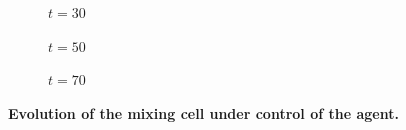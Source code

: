 \begin{figure}
\begin{subfigure}[t]{.22\textwidth}
    	\caption{$t=30$}
	\label{fig:mixing_field_30}
\end{subfigure} \quad
\begin{subfigure}[t]{.22\textwidth}
	\centering
    	\caption{$t=50$}
	\label{fig:mixing_field_50}
\end{subfigure} \quad
\begin{subfigure}[t]{.22\textwidth}
	\centering
    	\caption{$t=70$}
	\label{fig:mixing_field_70}
\end{subfigure}

\caption{\textbf{Evolution of the mixing cell under control of the agent.}}
\label{fig:mixing_fields}
\end{figure} 
